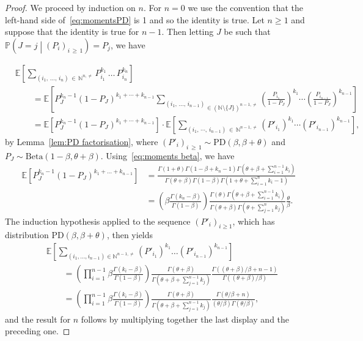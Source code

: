 \documentclass[AHL,Unicode,longabstracts,published]{cedram}
\newcommand{\Ec}[1]{\mathbb{E} \left[#1\right]}
\newcommand{\Ppsq}[2]{\mathbb{P} \left(#1\mathrel{}\middle|\mathrel{}#2\right)}
\newcommand{\Betal}{\mathrm{Beta}}
\newcommand{\PD}{\mathrm{PD}}
\newcommand{\N}{\mathbb{N}}
\begin{document}
\begin{proof}
We proceed by induction on $n$. For $n=0$ we use the convention that the left-hand side of~\eqref{eq:momentsPD} is 1 and so the identity is true. Let $n\geq 1$ and suppose that the identity is true for $n-1$. Then letting $J$ be such that $\Ppsq{J=j}{(P_i)_{i\,\geq\,1}}=P_j$, we have

\begin{align*}
& \Ec{ \sum_{\left(i_1,\,\ldots,\,i_n\right)\,\in\,\N^{n,\neq}} P_{i_1}^{k_1}\,\dots\,P_{i_n}^{k_n} } \\
& \qquad =\Ec{ P_J^{k_n-1} (1-P_J)^{k_1+\cdots+k_{n-1} } \underset{\in \left(\N\setminus\{J\}\right)^{n-1,\neq}}{\sum_{\left(i_1,\,\dots,\,i_{n-1}\right)}}\left(\frac{P_{i_1}}{1-P_J} \right)^{k_1} \cdots \left(\frac{P_{i_{n-1}}}{1-P_J}\right) ^{k_{n-1}}}\\
& \qquad = \Ec{P_J^{k_n-1}\left(1-P_J\right)^{k_1+\cdots+k_{n-1}}} \cdot \Ec{\sum_{\left(i_1,\,\cdots,\,i_{n-1}\right)\,\in\,\N^{n-1,\neq}}\left(P'_{i_1}\right)^{k_1} \cdots \left(P'_{i_{n-1}}\right)^{k_{n-1}}},
\end{align*}
by Lemma~\ref{lem:PD factorisation}, where $(P'_i)_{i\,\geq\,1}\sim \PD(\beta,\beta+\theta)$ and $P_J\sim\Betal(1-\beta,\theta+\beta)$. Using~\eqref{eq:moments beta}, we have
\begin{align*}
\Ec{ P_J^{k_n-1}(1-P_J)^{k_1+\dots+k_{n-1}}}&=\frac{\Gamma(1+\theta)\Gamma(1-\beta+k_n-1)\Gamma\left(\theta+\beta+\sum\limits_{i=1}^{n-1}k_i\right)}{\Gamma(\theta+\beta)\Gamma(1-\beta)\Gamma\left(1+\theta+\sum\limits_{i=1}^{n}k_i-1\right)}\\
&=\left(\beta\frac{\Gamma(k_n-\beta)}{\Gamma(1-\beta)}\right)\frac{\Gamma(\theta)\Gamma\left(\theta+\beta+\sum\limits_{i=1}^{n-1}k_i\right)}{\Gamma(\theta+\beta)\Gamma\left(\theta+\sum\limits_{j=1}^{n}k_j\right)}\frac{\theta}{\beta}.
\end{align*}
The induction hypothesis applied to the sequence $(P'_i)_{i\geq 1}$, which has distribution $\PD(\beta,\beta+\theta)$, then yields
\begin{align*}
& \Ec{\sum_{(i_1,\dots,i_{n-1})\in \N^{n-1,\neq}}(P'_{i_1})^{k_1} \dots (P'_{i_{n-1}})^{k_{n-1}}} \\
&\qquad =\left(\prod_{i=1}^{n-1} \beta \frac{\Gamma(k_i-\beta)}{\Gamma(1-\beta)}\right)\frac{\Gamma(\theta+\beta)}{\Gamma(\theta+\beta+\sum_{j=1}^{n-1} k_j)} \frac{\Gamma((\theta+\beta)/\beta+n-1)}{\Gamma((\theta+\beta)/\beta)}\\
&\qquad =\left(\prod_{i=1}^{n-1} \beta \frac{\Gamma(k_i-\beta)}{\Gamma(1-\beta)}\right)\frac{\Gamma(\theta+\beta)}{\Gamma(\theta+\beta+\sum_{j=1}^{n-1} k_j)} \frac{\Gamma(\theta/\beta+n)}{(\theta/\beta)\Gamma(\theta/\beta)},
\end{align*}
and the result for $n$ follows by multiplying together the last display and the preceding one.
\end{proof}
\end{document}
